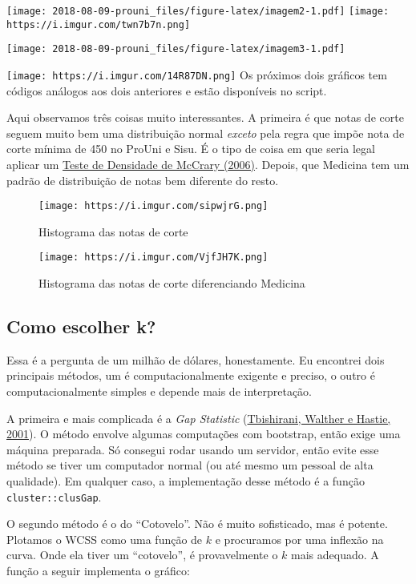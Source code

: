 \documentclass[]{article}
\begin{document}
\texttt{[image: 2018-08-09-prouni\_files/figure-latex/imagem2-1.pdf]}
\texttt{[image: https://i.imgur.com/twn7b7n.png]}

\texttt{[image: 2018-08-09-prouni\_files/figure-latex/imagem3-1.pdf]}

\texttt{[image: https://i.imgur.com/14R87DN.png]} Os próximos dois
gráficos tem códigos análogos aos dois anteriores e estão disponíveis no
script.

Aqui observamos três coisas muito interessantes. A primeira é que notas
de corte seguem muito bem uma distribuição normal \emph{exceto} pela
regra que impõe nota de corte mínima de 450 no ProUni e Sisu. É o tipo
de coisa em que seria legal aplicar um
\href{https://eml.berkeley.edu/~jmccrary/mccrary2006_DCdensity.pdf}{Teste
de Densidade de McCrary (2006)}. Depois, que Medicina tem um padrão de
distribuição de notas bem diferente do resto.

\begin{figure}
\centering
\texttt{[image: https://i.imgur.com/sipwjrG.png]}
\caption{Histograma das notas de corte}
\end{figure}

\begin{figure}
\centering
\texttt{[image: https://i.imgur.com/VjfJH7K.png]}
\caption{Histograma das notas de corte diferenciando Medicina}
\end{figure}

\subsection{Como escolher k?}\label{como-escolher-k}

Essa é a pergunta de um milhão de dólares, honestamente. Eu encontrei
dois principais métodos, um é computacionalmente exigente e preciso, o
outro é computacionalmente simples e depende mais de interpretação.

A primeira e mais complicada é a \emph{Gap Statistic}
(\href{https://statweb.stanford.edu/~gwalther/gap}{Tbishirani, Walther e
Hastie, 2001}). O método envolve algumas computações com bootstrap,
então exige uma máquina preparada. Só consegui rodar usando um servidor,
então evite esse método se tiver um computador normal (ou até mesmo um
pessoal de alta qualidade). Em qualquer caso, a implementação desse
método é a função \texttt{cluster::clusGap}.

O segundo método é o do ``Cotovelo''. Não é muito sofisticado, mas é
potente. Plotamos o WCSS como uma função de \(k\) e procuramos por uma
inflexão na curva. Onde ela tiver um ``cotovelo'', é provavelmente o
\(k\) mais adequado. A função a seguir implementa o gráfico:
\end{document}
